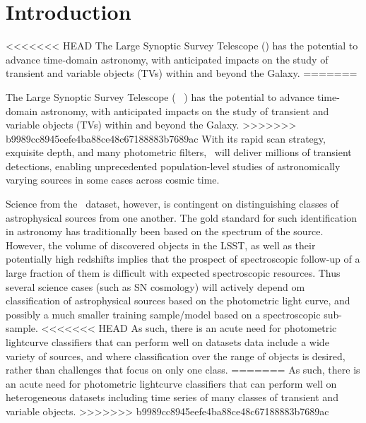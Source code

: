 \section{Introduction}
\label{sec:intro}

<<<<<<< HEAD
The Large Synoptic Survey Telescope (\lsst) has the potential to advance time-domain astronomy, with anticipated impacts on the study of transient and variable objects (TVs) within and beyond the Galaxy.
=======

The Large Synoptic Survey Telescope ( \lsst\ ) has the potential to advance time-domain astronomy, with anticipated impacts on the study of transient and variable objects (TVs) within and beyond the Galaxy.
>>>>>>> b9989cc8945eefe4ba88ce48c67188883b7689ac
With its rapid scan strategy, exquisite depth, and many photometric filters, \lsst\ will deliver millions of transient detections, enabling unprecedented population-level studies of astronomically varying sources in some cases across cosmic time.

Science from the \lsst\ dataset, however, is contingent on distinguishing classes of astrophysical sources
 from one another. The gold standard for such identification in astronomy has traditionally been
based on the spectrum of the source. However, the volume of discovered objects in the LSST, as well as their potentially high redshifts implies that the prospect of spectroscopic follow-up of a large fraction of them is difficult
with expected spectroscopic resources. Thus several science cases (such as SN cosmology) will actively depend om classification of astrophysical sources based on the photometric light curve, and possibly a much smaller training sample/model based on a spectroscopic sub-sample. 
<<<<<<< HEAD
As such, there is an acute need for photometric lightcurve classifiers that can perform well on datasets data include a wide variety of sources, and where classification over the range of objects is desired, rather than challenges that focus on only one class.
=======
As such, there is an acute need for photometric lightcurve classifiers that can perform well on  heterogeneous datasets including time series of many classes of transient and variable objects.
>>>>>>> b9989cc8945eefe4ba88ce48c67188883b7689ac

